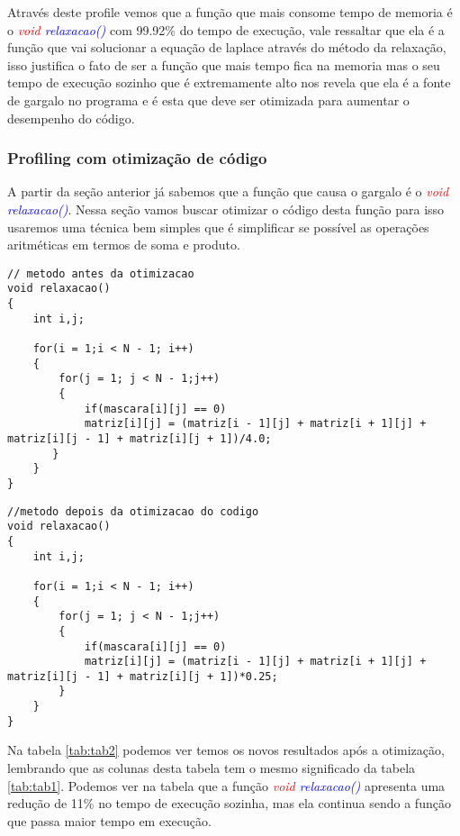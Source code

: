 \documentclass[]{article}
\begin{document}
Através deste profile vemos que a função que mais consome tempo de memoria é o \textit{\textcolor{red}{void} \textcolor{blue}{relaxacao()}} com 99.92\% do tempo de execução, vale ressaltar que ela é a função que vai solucionar a equação de laplace através do método da relaxação, isso justifica o fato de ser a função que mais tempo fica na memoria mas o seu tempo de execução sozinho que é extremamente alto nos revela que ela é a fonte de gargalo no programa e é esta que deve ser otimizada para aumentar o desempenho do código. 

\subsubsection{Profiling com otimização de código}

A partir da seção anterior já sabemos que a função que causa o gargalo é o \textit{\textcolor{red}{void} \textcolor{blue}{relaxacao()}}. Nessa seção vamos buscar otimizar o código desta função para isso usaremos uma técnica bem simples que é simplificar se possível as operações aritméticas em termos de soma e produto.

\begin{lstlisting}
// metodo antes da otimizacao
void relaxacao()
{
    int i,j;

    for(i = 1;i < N - 1; i++)
    {
        for(j = 1; j < N - 1;j++)
        {
            if(mascara[i][j] == 0)
            matriz[i][j] = (matriz[i - 1][j] + matriz[i + 1][j] + matriz[i][j - 1] + matriz[i][j + 1])/4.0;
       }
    }
}
\end{lstlisting}

\begin{lstlisting}
//metodo depois da otimizacao do codigo
void relaxacao()
{
	int i,j;

	for(i = 1;i < N - 1; i++)
	{
		for(j = 1; j < N - 1;j++)
		{
			if(mascara[i][j] == 0)
			matriz[i][j] = (matriz[i - 1][j] + matriz[i + 1][j] + matriz[i][j - 1] + matriz[i][j + 1])*0.25;
		}
	}
}
\end{lstlisting}

Na tabela \ref{tab:tab2} podemos ver temos os novos resultados após a otimização, lembrando que as colunas desta tabela tem o mesmo significado da tabela \ref{tab:tab1}. Podemos ver na tabela que a função \textit{\textcolor{red}{void} \textcolor{blue}{relaxacao()}} apresenta uma redução de 11\% no tempo de execução sozinha, mas ela continua sendo a função que passa maior tempo em execução.   
\end{document}
